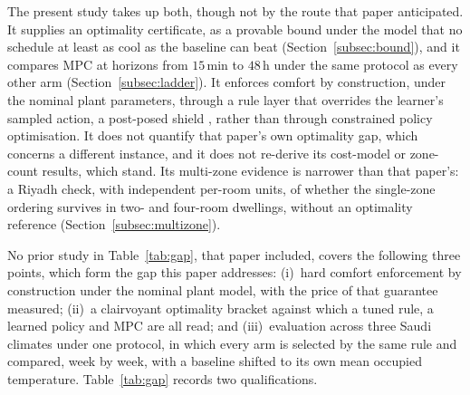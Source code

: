\documentclass[pdflatex,sn-mathphys-num,iicol]{sn-jnl}
\theoremstyle{thmstyleone}\newtheorem{proposition}{Proposition}\newtheorem{corollary}{Corollary}
\theoremstyle{thmstyletwo}\newtheorem{remark}{Remark}\newtheorem{observation}{Observation}
\theoremstyle{thmstylethree}\newtheorem{definition}{Definition}
\begin{document}
The present study takes up both, though not by the route that paper anticipated. It supplies an optimality certificate, as a provable bound under the model that no schedule at least as cool as the baseline can beat (Section~\ref{subsec:bound}), and it compares MPC at horizons from $15\,$min to $48\,$h under the same protocol as every other arm (Section~\ref{subsec:ladder}). It enforces comfort by construction, under the nominal plant parameters, through a rule layer that overrides the learner's sampled action, a post-posed shield \citep{Alshiekh2018}, rather than through constrained policy optimisation. It does not quantify that paper's own optimality gap, which concerns a different instance, and it does not re-derive its cost-model or zone-count results, which stand. Its multi-zone evidence is narrower than that paper's: a Riyadh check, with independent per-room units, of whether the single-zone ordering survives in two- and four-room dwellings, without an optimality reference (Section~\ref{subsec:multizone}).

No prior study in Table~\ref{tab:gap}, that paper included, covers the following three points, which form the gap this paper addresses: (i)~hard comfort enforcement by construction under the nominal plant model, with the price of that guarantee measured; (ii)~a clairvoyant optimality bracket against which a tuned rule, a learned policy and MPC are all read; and (iii)~evaluation across three Saudi climates under one protocol, in which every arm is selected by the same rule and compared, week by week, with a baseline shifted to its own mean occupied temperature. Table~\ref{tab:gap} records two qualifications.
 
\end{document}
